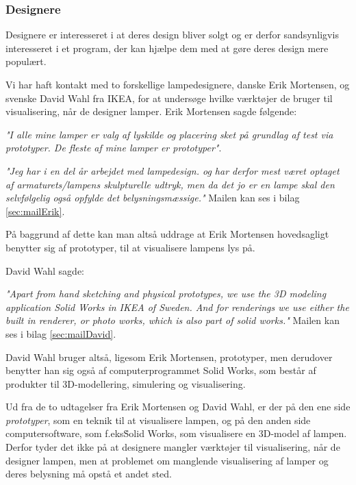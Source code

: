 \subsubsection{Designere}
Designere er interesseret i at deres design bliver solgt og er derfor sandsynligvis interesseret i et program, der kan hjælpe dem med at gøre deres design mere populært.
 
Vi har haft kontakt med to forskellige lampedesignere, danske Erik Mortensen, og svenske David Wahl fra IKEA, for at undersøge hvilke værktøjer de bruger til visualisering, når de designer lamper. Erik Mortensen sagde følgende: 
\begin{center}
\textit{"I alle mine lamper er valg af lyskilde og placering sket på grundlag af test via prototyper. De fleste af mine lamper er prototyper"}.

\textit{"Jeg har i en del år arbejdet med lampedesign. og har derfor mest været optaget af armaturets/lampens skulpturelle udtryk, men da det jo er en lampe skal den selvfølgelig  også opfylde det belysningsmæssige."} Mailen kan ses i bilag \ref{sec:mailErik}.
\end{center}

På baggrund af dette kan man altså uddrage at Erik Mortensen hovedsagligt benytter sig af prototyper, til at visualisere lampens lys på.

David Wahl sagde:
\begin{center}
\textit{"Apart from hand sketching and physical prototypes, we use the 3D modeling application Solid Works in IKEA of Sweden. And for renderings we use either the built in renderer, or photo works, which is also part of solid works."} Mailen kan ses i bilag \ref{sec:mailDavid}.
\end{center}

David Wahl bruger altså, ligesom Erik Mortensen, prototyper, men derudover benytter han sig også af computerprogrammet Solid Works, som består af produkter til 3D-modellering, simulering og visualisering\cite{solidworks}.

Ud fra de to udtagelser fra Erik Mortensen og David Wahl, er der på den ene side \textit{prototyper}, som en teknik til at visualisere lampen, og på den anden side computersoftware, som f.eks\. Solid Works, som visualisere en 3D-model af lampen. Derfor tyder det ikke på at designere mangler værktøjer til visualisering, når de designer lampen, men at problemet om manglende visualisering af lamper og deres belysning må opstå et andet sted.

